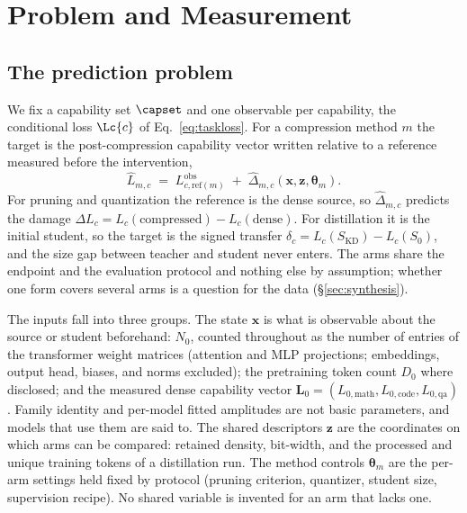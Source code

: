 \section{Problem and Measurement}
\label{sec:prelim}

\subsection{The prediction problem}
\label{sec:problem}

We fix a capability set $\capset$ and one observable per
capability, the conditional loss $\Lc{c}$ of Eq.~\eqref{eq:taskloss}.
For a compression method $m$ the target is the post-compression
capability vector written relative to a reference measured before the
intervention,
\begin{equation}
\hat L_{m,c} \;=\; L^{\mathrm{obs}}_{c,\mathrm{ref}(m)}
\;+\;\widehat{\Delta}_{m,c}(\mathbf x,\mathbf z,\boldsymbol\theta_m).
\label{eq:interface}
\end{equation}
For pruning and quantization the reference is the dense source, so
$\widehat\Delta_{m,c}$ predicts the damage
$\Delta L_c=L_c(\text{compressed})-L_c(\text{dense})$. For distillation
it is the initial student, so the target is the signed transfer
$\delta_c=L_c(S_{\mathrm{KD}})-L_c(S_0)$, and the size gap between
teacher and student never enters. The arms share the endpoint and the
evaluation protocol and nothing else by assumption; whether one form
covers several arms is a question for the data (\S\ref{sec:synthesis}).

The inputs fall into three groups. The state $\mathbf x$ is what is
observable about the source or student beforehand: $N_0$, counted
throughout as the number of entries of the transformer weight matrices
(attention and MLP projections; embeddings, output head, biases, and
norms excluded); the pretraining token count $D_0$ where disclosed;
and the measured dense capability vector
$\mathbf L_0=(L_{0,\text{math}},L_{0,\text{code}},L_{0,\text{qa}})$.
Family identity and per-model fitted amplitudes are not basic
parameters, and models that use them are said to. The shared
descriptors $\mathbf z$ are the coordinates on which arms can be
compared: retained density, bit-width, and the processed and unique
training tokens of a distillation run. The method controls
$\boldsymbol\theta_m$ are the per-arm settings held fixed by protocol
(pruning criterion, quantizer, student size, supervision recipe). No
shared variable is invented for an arm that lacks one.

